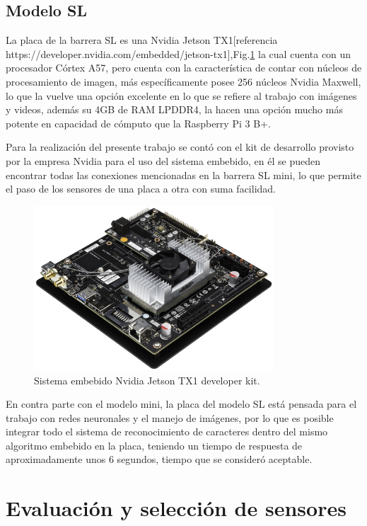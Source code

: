 \subsection{Modelo SL}
La placa de la barrera SL es una Nvidia Jetson TX1[referencia https://developer.nvidia.com/embedded/jetson-tx1],Fig.\ref{fig:JTX1} la cual cuenta con un procesador Córtex A57, pero
cuenta con la característica de contar con núcleos de procesamiento de imagen, más específicamente posee 256 núcleos Nvidia Maxwell,
lo que la vuelve una opción excelente en lo que se refiere al trabajo con imágenes y videos, además su 4GB de RAM LPDDR4,
la hacen una opción mucho más potente en capacidad de cómputo que la Raspberry Pi 3 B+.


Para la realización del presente trabajo se contó con el kit de desarrollo provisto por la empresa Nvidia para el uso
del sistema embebido, en él se pueden encontrar todas las conexiones mencionadas en la barrera SL mini, lo que permite
el paso de los sensores de una placa a otra con suma facilidad.

\begin{figure}
    \centering
    \includegraphics[width=0.8\textwidth]{imgs/JTX1-developerkit.png}
    \caption{Sistema embebido Nvidia Jetson TX1 developer kit.}
    \label{fig:JTX1}
\end{figure}


En contra parte con el modelo mini, la placa del modelo SL está pensada para el trabajo con redes neuronales y el manejo de imágenes, por lo que es posible integrar todo el sistema de reconocimiento de caracteres dentro del mismo algoritmo embebido en la placa, teniendo un tiempo de respuesta de aproximadamente unos 6 segundos, tiempo que se consideró aceptable.

\section{Evaluación y selección de sensores}

